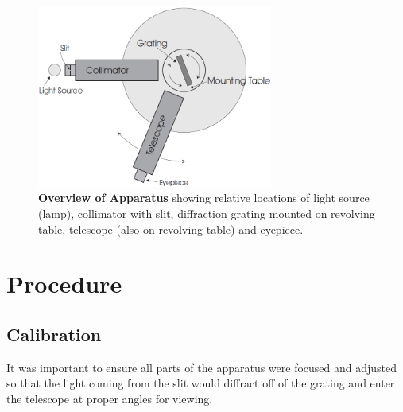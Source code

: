 \documentclass[paper=a4, fontsize=11pt]{scrartcl} %
\numberwithin{equation}{section}
\numberwithin{figure}{section}
\numberwithin{table}{section}
\begin{document}
\begin{figure}[H] \begin{center}
  \includegraphics[height=60mm]{diagram1.png}
  \caption{\textbf{Overview of Apparatus} showing relative locations of light source (lamp), collimator with slit, diffraction grating mounted on revolving table, telescope (also on revolving table) and eyepiece.}
  \label{fig:diagram1}
\end{center} \end{figure}



\section{Procedure}

\subsection{Calibration}

It was important to ensure all parts of the apparatus were focused and adjusted so that the light coming from the slit would diffract off of the grating and enter the telescope at proper angles for viewing.
\end{document}
